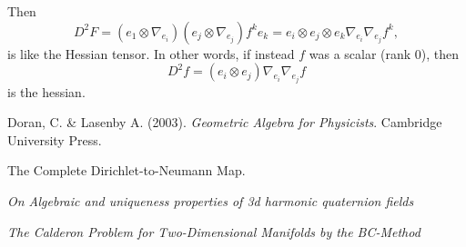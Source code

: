 Then
\[
D^2F = (e_1 \otimes \nabla_{e_i})(e_j\otimes \nabla_{e_j})f^ke_{k} = e_i \otimes e_j \otimes e_k \nabla_{e_i} \nabla_{e_j} f^k,
\]
is like the Hessian tensor. In other words, if instead $f$ was a scalar (rank 0), then
\[
D^2f = (e_i \otimes e_j) \nabla_{e_i} \nabla_{e_j} f
\]
is the hessian.


\newpage
\begin{thebibliography}{1}
    
 Doran, C. \& Lasenby A. (2003). \emph{Geometric Algebra for Physicists}. Cambridge University Press.

 The Complete Dirichlet-to-Neumann Map.

 \emph{On Algebraic and uniqueness properties of 3d harmonic quaternion fields}

 \emph{The Calderon Problem for Two-Dimensional Manifolds by the BC-Method}
	
	
\end{thebibliography}

